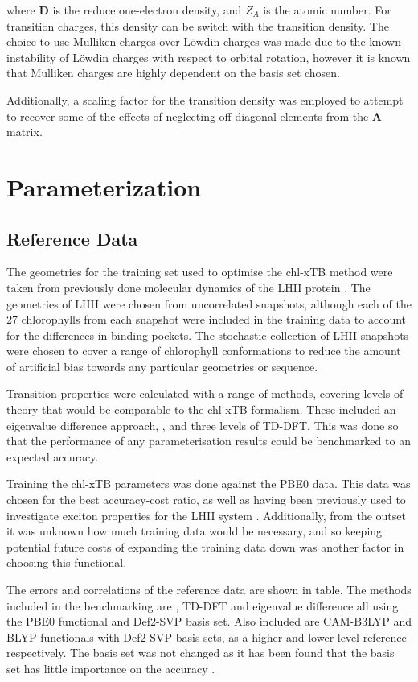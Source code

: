 where $\mathbf{D}$ is the reduce one-electron density, and $Z_A$ is the atomic number.
For transition charges, this density can be switch with the transition density. 
The choice to use Mulliken charges over L{\"o}wdin charges was made due to the known
instability of L{\"o}wdin charges with respect to orbital rotation, however it is
known that Mulliken charges are highly dependent on the basis set chosen. 

Additionally, a scaling factor for the transition density was employed to attempt
to recover some of the effects of neglecting off diagonal elements from the $\mathbf{A}$
matrix.

\afterpartskip
\section{Parameterization}
\label{sec:chl_params}
\subsection{Reference Data}
\label{subsec:ref_data}
The geometries for the training set used to optimise the chl-xTB method were taken
from previously done molecular dynamics of the LHII protein \cite{Stross2016}. 
The geometries of LHII were chosen from uncorrelated snapshots, although each of
the 27 chlorophylls from each snapshot were included in the training data to account
for the differences in binding pockets. The stochastic collection of LHII snapshots
were chosen to cover a range of chlorophyll conformations to reduce the amount of
artificial bias towards any particular geometries or sequence.

Transition properties were calculated with a range of methods, covering levels of
theory that would be comparable to the chl-xTB formalism. These included an eigenvalue
difference approach, \dscf, and three levels of TD-DFT. This was done so that the
performance of any parameterisation results could be benchmarked to an expected
accuracy.

Training the chl-xTB parameters was done against the PBE0 data. This data was chosen
for the best accuracy-cost ratio, as well as having been previously used to investigate
exciton properties for the LHII system \cite{Stross2016}. Additionally, from the
outset it was unknown how much training data would be necessary, and so keeping 
potential future costs of expanding the training data down was another factor in 
choosing this functional.

The errors and correlations of the reference data are shown in table. The methods
included in the benchmarking are \dscf, TD-DFT and eigenvalue difference all using
the PBE0 functional and Def2-SVP basis set. Also included are CAM-B3LYP and BLYP
functionals with Def2-SVP basis sets, as a higher and lower level reference respectively.
The basis set was not changed as it has been found that the basis set has little
importance on the accuracy \cite{Stross2016}.

